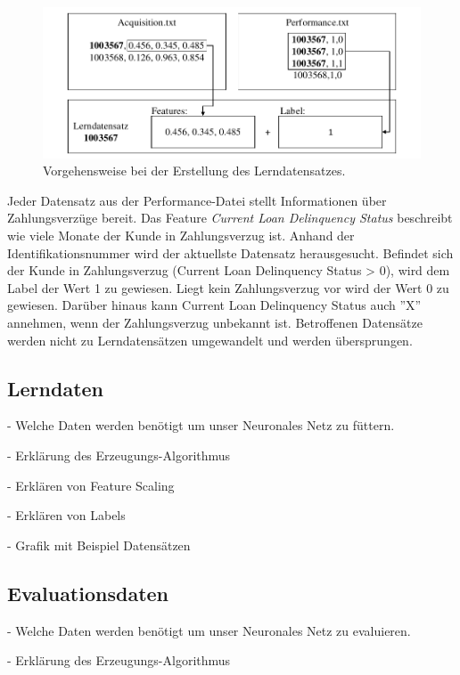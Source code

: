 \begin{figure}[ht]
\centering
\includegraphics{images/cleansing.pdf}
\caption{Vorgehensweise bei der Erstellung des Lerndatensatzes.}
\label{fig:cleansing}
\end{figure}  

Jeder Datensatz aus der Performance-Datei stellt Informationen über Zahlungsverzüge bereit. Das Feature \textit{Current Loan Delinquency Status} beschreibt wie viele Monate der Kunde in Zahlungsverzug ist. Anhand der Identifikationsnummer wird der aktuellste Datensatz herausgesucht. Befindet sich der Kunde in Zahlungsverzug (Current Loan Delinquency Status > 0), wird dem Label der Wert 1 zu gewiesen. Liegt kein Zahlungsverzug vor wird der Wert 0 zu gewiesen. Darüber hinaus kann Current Loan Delinquency Status auch ''X'' annehmen, wenn der Zahlungsverzug unbekannt ist. Betroffenen Datensätze werden nicht zu Lerndatensätzen umgewandelt und werden übersprungen.  

\subsection{Lerndaten}
\label{subsec:Lerndaten3}

- Welche Daten werden benötigt um unser Neuronales Netz zu füttern.

- Erklärung des Erzeugungs-Algorithmus 

- Erklären von Feature Scaling

- Erklären von Labels

- Grafik mit Beispiel Datensätzen

\subsection{Evaluationsdaten}
\label{subsec:Evaluationsdaten3}

- Welche Daten werden benötigt um unser Neuronales Netz zu evaluieren.

- Erklärung des Erzeugungs-Algorithmus 

